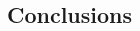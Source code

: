 \documentclass[a1,landscape]{a0poster}
\begin{document}
\begin{multicols}{4}
\section*{Conclusions}





\nocite{*} %



\end{multicols}
\end{document}

